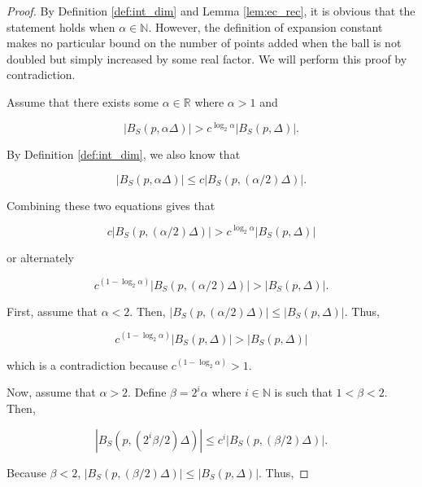 \begin{proof}
By Definition \ref{def:int_dim} and Lemma \ref{lem:ec_rec}, it is obvious that
the statement holds when $\alpha \in \mathbb{N}$.  However, the definition of
expansion constant makes no particular bound on the number of points added when
the ball is not doubled but simply increased by some real factor.  We will
perform this proof by contradiction.

Assume that there exists some $\alpha \in \mathbb{R}$ where $\alpha > 1$ and

\begin{equation}
| B_S(p, \alpha \Delta) | > c^{\log_2 \alpha} | B_S(p, \Delta) |.
\end{equation}

By Definition \ref{def:int_dim}, we also know that

\begin{equation}
| B_S(p, \alpha \Delta) | \le c | B_S(p, (\alpha / 2) \Delta) |.
\end{equation}

Combining these two equations gives that

\begin{equation}
c | B_S(p, (\alpha / 2) \Delta) | > c^{\log_2 \alpha} | B_S(p, \Delta) |
\end{equation}

\noindent or alternately

\begin{equation}
c^{(1 - \log_2 \alpha)} | B_S(p, (\alpha / 2) \Delta) | > | B_S(p, \Delta) |.
\end{equation}

First, assume that $\alpha < 2$.  Then, $|B_S(p, (\alpha / 2) \Delta)| \le
|B_S(p, \Delta)|$.  Thus,

\begin{equation}
c^{(1 - \log_2 \alpha)} | B_S(p, \Delta) | > | B_S(p, \Delta) |
\end{equation}

\noindent which is a contradiction because $c^{(1 - \log_2 \alpha)} > 1$.

Now, assume that $\alpha > 2$.  Define $\beta = 2^i \alpha$ where $i \in
\mathbb{N}$ is such that $1 < \beta < 2$.  Then,

\begin{equation}
| B_S(p, (2^i \beta / 2) \Delta) | \le c^i | B_S(p, (\beta / 2) \Delta) |.
\end{equation}

Because $\beta < 2$, $|B_S(p, (\beta / 2) \Delta)| \le |B_S(p, \Delta)|$.  Thus,


\end{proof}
